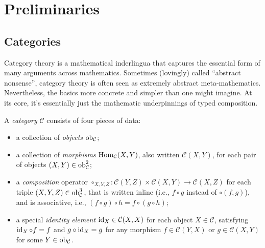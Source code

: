     \label{chap:PDG-cat}


\section{Preliminaries}

\subsection{Categories}
Category theory is a mathematical inderlingua that captures the essential form of many arguments across mathematics. 
Sometimes (lovingly) called ``abstract nonsense'', category theory is often seen as extremely abstract meta-mathematics.  
Nevertheless, the basics more concrete and simpler than one might imagine.
At its core, it's essentially just the mathematic underpinnings of typed composition.  

\begin{defn}[category]
    A \emph{category} $\mathcal C$ consists of four pieces of data:
    \begin{itemize}[left=0pt,topsep=0pt]
        \item a collection of \emph{objects} $\operatorname{\mathop{\mathrm{ob}}}_{\cal C}$;
        \item a collection of \emph{morphisms}
            $\operatorname{\mathop{\mathrm{Hom}}}_{\mathcal C}(X,Y)$,  also written $\mathcal C(X,Y)$, for each pair of objects $(X,Y) \in \operatorname{\mathop{\mathrm{ob}}}_{\mathcal C}^2$;
        \item a \emph{composition} operator 
        $\circ_{X,Y,Z}: \mathcal C(Y,Z) \times \mathcal C(X,Y) \to \mathcal C(X,Z)$ for each triple $(X,Y,Z) \in \operatorname{\mathop{\mathrm{ob}}}_{\cal C}^3$, that is written inline (i.e., $f \circ g$ instead of $\circ(f,g)$), and is associative, i.e., $(f \circ g) \circ h = f \circ (g \circ h)$;
        \item a special \emph{identity element} $\operatorname{\mathrm{id}}_{X} \in \mathcal C(X,X)$ for each object $X \in \mathcal C$, satisfying $\operatorname{\mathrm{id}}_X \circ f = f$ and $g \circ \operatorname{\mathrm{id}}_X = g$ for any morphism $f \in \mathcal C(Y,X)$ or $g \in \mathcal C(X,Y)$ for some $Y \in \operatorname{\mathop{\mathrm{ob}}}_{\mathcal C}$.
        \qedhere
    \end{itemize}    
\end{defn}

